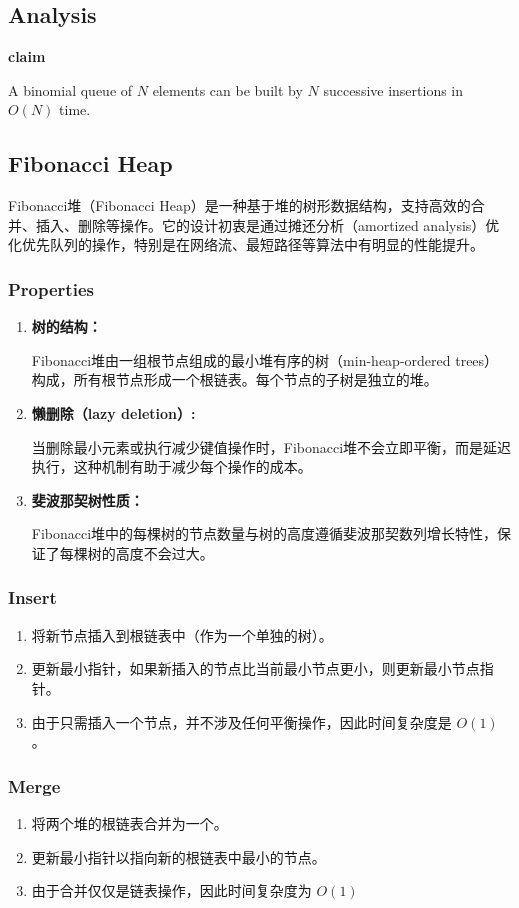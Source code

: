 \documentclass{article}
\begin{document}
\subsection{Analysis}
\textbf{claim}\par
A binomial queue of $N$ elements can be built by $N$ successive insertions in $O(N)$ time. 

\subsection{Fibonacci Heap}
Fibonacci堆（Fibonacci Heap）是一种基于堆的树形数据结构，支持高效的合并、插入、删除等操作。它的设计初衷是通过摊还分析（amortized analysis）优化优先队列的操作，特别是在网络流、最短路径等算法中有明显的性能提升。

\subsubsection{Properties}
\begin{enumerate}
    \item \textbf{树的结构：}\par
    Fibonacci堆由一组根节点组成的最小堆有序的树（min-heap-ordered trees）构成，所有根节点形成一个根链表。每个节点的子树是独立的堆。
    \item \textbf{懒删除（lazy deletion）:}\par
    当删除最小元素或执行减少键值操作时，Fibonacci堆不会立即平衡，而是延迟执行，这种机制有助于减少每个操作的成本。
    \item \textbf{斐波那契树性质：}\par
    Fibonacci堆中的每棵树的节点数量与树的高度遵循斐波那契数列增长特性，保证了每棵树的高度不会过大。
\end{enumerate}

\subsubsection{Insert}
\begin{enumerate}
    \item 将新节点插入到根链表中（作为一个单独的树）。
    \item 更新最小指针，如果新插入的节点比当前最小节点更小，则更新最小节点指针。
    \item 由于只需插入一个节点，并不涉及任何平衡操作，因此时间复杂度是 $O(1)$。
\end{enumerate}

\subsubsection{Merge}
\begin{enumerate}
    \item 将两个堆的根链表合并为一个。
    \item 更新最小指针以指向新的根链表中最小的节点。
    \item 由于合并仅仅是链表操作，因此时间复杂度为 $O(1)$
\end{enumerate}
\end{document}
